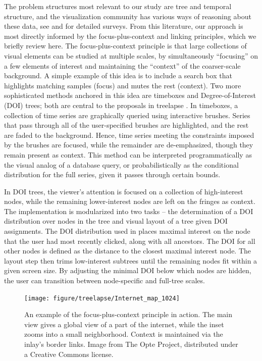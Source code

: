 The problem structures most relevant to our study are tree and temporal
structure, and the visualization community has various ways of reasoning about
these data, see \cite{graham2010survey} and \cite{aigner2011visualization} for
detailed surveys. From this literature, our approach is most directly informed
by the focus-plus-context and linking principles, which we briefly review here.
The focus-plus-context principle is that large collections of visual elements
can be studied at multiple scales, by simultaneously ``focusing'' on a few elements
of interest and maintaining the ``context'' of the coarser-scale background. A
simple example of this idea is to include a search box that highlights matching
samples (focus) and mutes the rest (context). Two more sophisticated methods
anchored in this idea are timeboxes and Degree-of-Interest (DOI) trees; both are
central to the proposals in treelapse \citep{hochheiser2004dynamic,
  heer2004doitrees}. In timeboxes, a collection of time series are graphically
queried using interactive brushes. Series that pass through all of the
user-specified brushes are highlighted, and the rest are faded to the
background. Hence, time series meeting the constraints imposed by the brushes
are focused, while the remainder are de-emphasized, though they remain present
as context. This method can be interpreted programmatically as the visual analog
of a database query, or probabilistically as the conditional distribution for
the full series, given it passes through certain bounds.

In DOI trees, the viewer's attention is focused on a collection of high-interest
nodes, while the remaining lower-interest nodes are left on the fringes as
context. The implementation is modularized into two tasks -- the determination
of a DOI distribution over nodes in the tree and visual layout of a tree given
DOI assignments. The DOI distribution used in \citep{heer2004doitrees} places
maximal interest on the node that the user had most recently clicked, along with
all ancestors. The DOI for all other nodes is defined as the distance to the
closest maximal interest node. The layout step then trims low-interest subtrees
until the remaining nodes fit within a given screen size. By adjusting the
minimal DOI below which nodes are hidden, the user can transition between
node-specific and full-tree scales.

\begin{figure}
  \centering
  \texttt{[image: figure/treelapse/Internet\_map\_1024]}
  \caption{An example of the focus-plus-context principle in action. The main
    view gives a global view of a part of the internet, while the inset zooms
    into a small neighborhood. Context is maintained via the inlay's border
    links. Image from The Opte Project, distributed under a Creative Commons
    license. \label{fig:internet_map}}
\end{figure}

